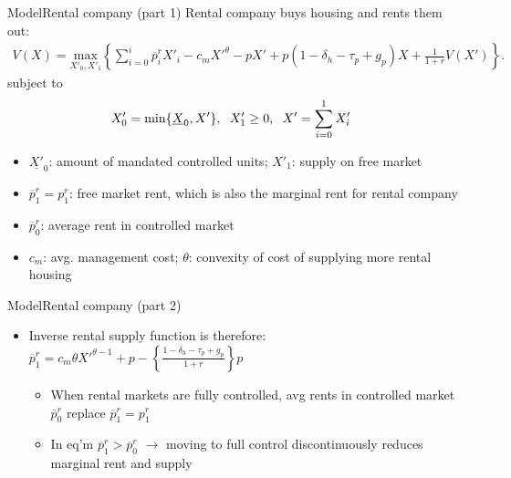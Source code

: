 \documentclass[11pt,aspectratio=169]{beamer}
\begin{document}
\begin{frame}{Model}{Rental company (part 1)}
Rental company buys housing and rents them out: 
\begin{align}\label{eq:rental_company_problem}
V(X)=\underset{X'_{0},X'_{1}} {\text{$\mbox{max} $}}\left\{\sum_{i=0}^{i} \overline{p}^{r}_{i}X'_{i}-c_{m}X'^{\theta}-p X'+p(1-\delta_{h}-\tau_{p}+g_{p})X+\frac{1}{1+r}V(X')\right\}.
\end{align}
subject to
\begin{align*}
& X'_{0}=\mbox{min}\{\underline{X}_{0},X'\}, \hspace{0.2cm} X'_{1} \geq 0, \hspace{0.2cm} X'=\sum^{1}_{i=0} X'_{i} 
\end{align*}

\begin{itemize}
    \item $\underline{X'}_{0}$: amount of mandated controlled units; $X'_{1}$: supply on free market
    \item $\overline{p}^{r}_{1}=p^{r}_{1}$: free market rent, which is also the marginal rent for rental company
    \item $\overline{p}^{r}_{0}$: average rent in controlled market
    \item $c_{m}$: avg. management cost; $\theta$: convexity of cost of supplying more rental housing
\end{itemize}

\end{frame}

\begin{frame}{Model}{Rental company (part 2)}

\begin{itemize}
    \item Inverse rental supply function is therefore: $\overline{p}^{r}_{1}=c_{m}\theta X'^{\theta-1}+p-\left\{\frac{1-\delta_{h}-\tau_p+g_{p}}{1+r}\right\}p$ 
    \begin{itemize}
        \item When rental markets are fully controlled, avg rents in controlled market $\overline{p}^{r}_{0}$ replace $\overline{p}^{r}_{1}=p^{r}_{1}$
        \item In eq'm $\overline{p}^{r}_{1}>\overline{p}^{r}_{0}$ $\rightarrow$ moving to full control discontinuously reduces marginal rent and supply
    \end{itemize}
\end{itemize}

\end{frame}
\end{document}
